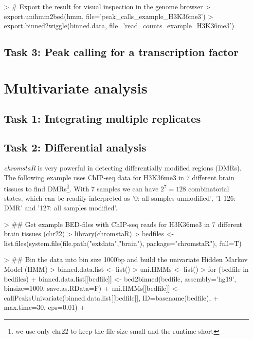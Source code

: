 \documentclass[11pt]{article}
\newcommand{\Rpackage}[1]{{\textit{#1}}}
\begin{document}
\begin{scriptsize}
\begin{Schunk}
\begin{Sinput}
> # Export the result for visual inspection in the genome browser
> export.unihmm2bed(hmm, file='peak_calls_example_H3K36me3')
> export.binned2wiggle(binned.data, file='read_counts_example_H3K36me3')
\end{Sinput}
\end{Schunk}
\end{scriptsize}


\subsection{Task 3: Peak calling for a transcription factor}

\section{Multivariate analysis}
\subsection{Task 1: Integrating multiple replicates}

\subsection{Task 2: Differential analysis}

\Rpackage{chromstaR} is very powerful in detecting differentially modified regions (DMRs). The following example uses ChIP-seq data for H3K36me3 in 7 different brain tissues to find DMRs\footnote{we use only chr22 to keep the file size small and the runtime short}. With 7 samples we can have $2^7 = 128$ combinatorial states, which can be readily interpreted as '0: all samples unmodified', '1-126: DMR' and '127: all samples modified'.
\begin{scriptsize}
\begin{Schunk}
\begin{Sinput}
> ## Get example BED-files with ChIP-seq reads for H3K36me3 in 7 different brain tissues (chr22)
> library(chromstaR)
> bedfiles <- list.files(system.file(file.path("extdata","brain"), package="chromstaR"), full=T)
\end{Sinput}
\end{Schunk}
\end{scriptsize}

\begin{scriptsize}
\begin{Schunk}
\begin{Sinput}
> ## Bin the data into bin size 1000bp and build the univariate Hidden Markov Model (HMM)
> binned.data.list <- list()
> uni.HMMs <- list()
> for (bedfile in bedfiles) {
+   binned.data.list[[bedfile]] <- bed2binned(bedfile, assembly='hg19', binsize=1000, save.as.RData=F)
+   uni.HMMs[[bedfile]] <- callPeaksUnivariate(binned.data.list[[bedfile]], ID=basename(bedfile), 
+                                              max.time=30, eps=0.01)
+ }
\end{Sinput}
\end{Schunk}
\end{scriptsize}
\end{document}

